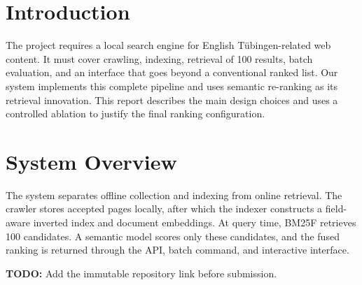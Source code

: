 \documentclass{article}
\newcommand{\reporttodo}[1]{{\small\textcolor{TUred}{\textbf{TODO:} #1}}}
\begin{document}

\begin{abstract}
We present an end-to-end search engine for English web content related to
Tübingen. The system combines a resumable focused crawler, a self-implemented
BM25F first stage, semantic second-stage re-ranking, batch retrieval, and an
interactive result interface. In a diagnostic 20-query ablation, semantic
re-ranking outperforms BM25F and the evaluated proximity bonus does not improve
effectiveness. After configuration was frozen, re-ranking improved nDCG@10
from 0.5382 to 0.5965 on a separate 10-query test set.
\end{abstract}

\section{Introduction}
The project requires a local search engine for English Tübingen-related web
content. It must cover crawling, indexing, retrieval of 100 results, batch
evaluation, and an interface that goes beyond a conventional ranked list. Our
system implements this complete pipeline and uses semantic re-ranking as its
retrieval innovation. This report describes the main design choices and uses a
controlled ablation to justify the final ranking configuration.

\section{System Overview}
The system separates offline collection and indexing from online retrieval.
The crawler stores accepted pages locally, after which the indexer constructs a
field-aware inverted index and document embeddings. At query time, BM25F
retrieves 100 candidates. A semantic model scores only these candidates, and
the fused ranking is returned through the API, batch command, and interactive
interface.

\reporttodo{Add the immutable repository link before submission.}
\end{document}
